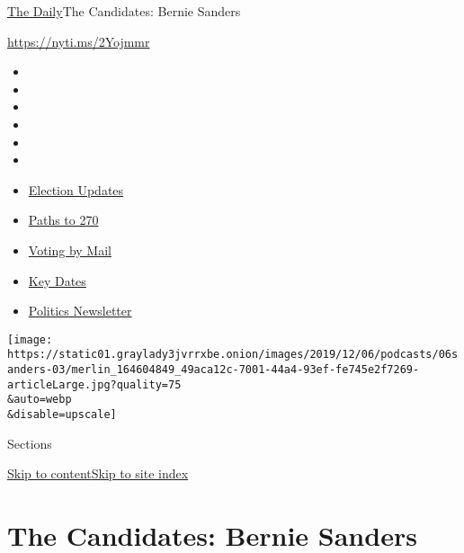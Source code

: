 \href{/podcasts/the-daily}{The Daily}\textbar{}The Candidates: Bernie
Sanders

\url{https://nyti.ms/2Yojmmr}

\begin{itemize}
\item
\item
\item
\item
\item
\item
\end{itemize}

\begin{itemize}
\item
  \href{https://www.nytimes3xbfgragh.onion/live/2020/09/07/us/trump-vs-biden?action=click\&pgtype=Article\&state=default\&region=TOP_BANNER\&context=storylines_menu}{Election
  Updates}
\item
  \href{https://www.nytimes3xbfgragh.onion/interactive/2020/us/elections/election-states-biden-trump.html?action=click\&pgtype=Article\&state=default\&region=TOP_BANNER\&context=storylines_menu}{Paths
  to 270}
\item
  \href{https://www.nytimes3xbfgragh.onion/interactive/2020/08/31/us/politics/vote-by-mail-deadlines.html?action=click\&pgtype=Article\&state=default\&region=TOP_BANNER\&context=storylines_menu}{Voting
  by Mail}
\item
  \href{https://www.nytimes3xbfgragh.onion/interactive/2019/us/elections/2020-presidential-election-calendar.html?action=click\&pgtype=Article\&state=default\&region=TOP_BANNER\&context=storylines_menu}{Key
  Dates}
\item
  \href{https://www.nytimes3xbfgragh.onion/newsletters/politics?action=click\&pgtype=Article\&state=default\&region=TOP_BANNER\&context=storylines_menu}{Politics
  Newsletter}
\end{itemize}

\texttt{[image: https://static01.graylady3jvrrxbe.onion/images/2019/12/06/podcasts/06sanders-03/merlin\_164604849\_49aca12c-7001-44a4-93ef-fe745e2f7269-articleLarge.jpg?quality=75\\\&auto=webp\\\&disable=upscale]}

Sections

\protect\hyperlink{site-content}{Skip to
content}\protect\hyperlink{site-index}{Skip to site index}

\hypertarget{the-candidates-bernie-sanders}{%
\section{The Candidates: Bernie
Sanders}\label{the-candidates-bernie-sanders}}

